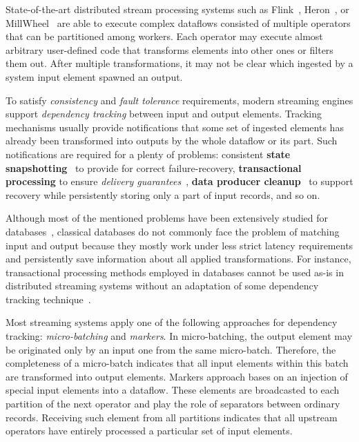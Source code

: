 \label {fs-acker-intro}

State-of-the-art distributed stream processing systems such as Flink~\cite{Carbone:2017:SMA:3137765.3137777}, Heron~\cite{Kulkarni:2015:THS:2723372.2742788}, or MillWheel~\cite{Akidau:2013:MFS:2536222.2536229} are able to execute complex dataflows consisted of multiple operators that can be partitioned among workers. Each operator may execute almost arbitrary user-defined code that transforms elements into other ones or filters them out. After multiple transformations, it may not be clear which ingested by a system input element spawned an output. 

To satisfy {\em consistency} and {\em fault tolerance} requirements, modern streaming engines support {\em dependency tracking} between input and output elements. Tracking mechanisms usually provide notifications that some set of ingested elements has already been transformed into outputs by the whole dataflow or its part. Such notifications are required for a plenty of problems: consistent {\bf state snapshotting}~\cite{Akidau:2013:MFS:2536222.2536229, 2015arXiv150608603C} to provide for correct failure-recovery, {\bf transactional processing} to ensure {\em delivery guarantees}~\cite{thepaper, Carbone:2017:SMA:3137765.3137777}, {\bf data producer cleanup}~\cite{Noghabi:2017:SSS:3137765.3137770} to support recovery while persistently storing only a part of input records, and so on. 

Although most of the mentioned problems have been extensively studied for databases~\cite{DBLP:books/mk/WeikumV2002}, classical databases do not commonly face the problem of matching input and output because they mostly work under less strict latency requirements and persistently save information about all applied transformations. For instance, transactional processing methods employed in databases cannot be used as-is in distributed streaming systems without an adaptation of some dependency tracking technique~\cite{2015arXiv150608603C}.

Most streaming systems apply one of the following approaches for dependency tracking: {\em micro-batching} and {\em markers}. In micro-batching, the output element may be originated only by an input one from the same micro-batch. Therefore, the completeness of a micro-batch indicates that all input elements within this batch are transformed into output elements. Markers approach bases on an injection of special input elements into a dataflow. These elements are broadcasted to each partition of the next operator and play the role of separators between ordinary records. Receiving such element from all partitions indicates that all upstream operators have entirely processed a particular set of input elements. 

